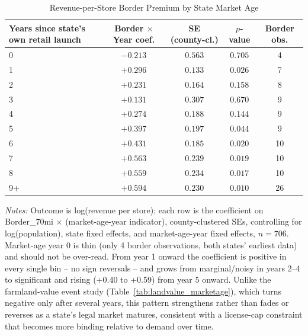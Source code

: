 \begin{table}[htbp]
\centering
\caption{Revenue-per-Store Border Premium by State Market Age}
\label{tab:revenue_perstore_eventstudy}
\begin{tabular}{lcccc}
\toprule
Years since state's own retail launch & Border $\times$ Year coef. & SE (county-cl.) & $p$-value & Border obs.\\
\midrule
0 & $-0.213$ & $0.563$ & $0.705$ & 4 \\
1 & $+0.296$ & $0.133$ & $0.026$ & 7 \\
2 & $+0.231$ & $0.164$ & $0.158$ & 8 \\
3 & $+0.131$ & $0.307$ & $0.670$ & 9 \\
4 & $+0.274$ & $0.188$ & $0.144$ & 9 \\
5 & $+0.397$ & $0.197$ & $0.044$ & 9 \\
6 & $+0.431$ & $0.185$ & $0.020$ & 10 \\
7 & $+0.563$ & $0.239$ & $0.019$ & 10 \\
8 & $+0.559$ & $0.234$ & $0.017$ & 10 \\
9+ & $+0.594$ & $0.230$ & $0.010$ & 26 \\
\bottomrule
\end{tabular}
\begin{minipage}{0.95\textwidth}
\vspace{0.3em}
\footnotesize
\textit{Notes:} Outcome is log(revenue per store); each row is the coefficient on
Border\_70mi $\times$ (market-age-year indicator), county-clustered SEs, controlling for log(population),
state fixed effects, and market-age-year fixed effects, $n=706$. Market-age year 0 is thin (only 4 border
observations, both states' earliest data) and should not be over-read. From year 1 onward the coefficient
is positive in every single bin -- no sign reversals -- and grows from marginal/noisy in years 2--4 to
significant and rising (+0.40 to +0.59) from year 5 onward. Unlike the farmland-value event study
(Table~\ref{tab:landvalue_marketage}), which turns negative only after several years, this pattern
strengthens rather than fades or reverses as a state's legal market matures, consistent with a license-cap
constraint that becomes more binding relative to demand over time.
\end{minipage}
\end{table}
